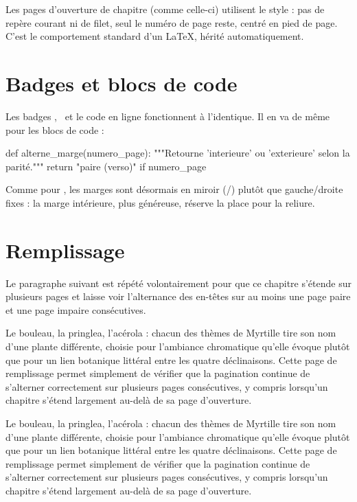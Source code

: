 \documentclass[theme=pringlea]{myrtillebook}
\begin{document}
\begin{infobox}
Les pages d'ouverture de chapitre (comme celle-ci) utilisent le style  : pas de repère courant ni de filet, seul le numéro de page reste, centré en pied de page. C'est le comportement standard d'un  LaTeX, hérité automatiquement.
\end{infobox}

\section{Badges et blocs de code}
Les badges \badgeReq, \badgeOpt\ et le code en ligne  fonctionnent à l'identique. Il en va de même pour les blocs de code :

\begin{pyblock}
def alterne_marge(numero_page):
    """Retourne 'interieure' ou 'exterieure' selon la parité."""
    return "paire (verso)" if numero_page %
\end{pyblock}

\begin{warnbox}
Comme pour , les marges sont désormais en miroir (/) plutôt que gauche/droite fixes : la marge intérieure, plus généreuse, réserve la place pour la reliure.
\end{warnbox}

\section{Remplissage}
Le paragraphe suivant est répété volontairement pour que ce chapitre s'étende sur plusieurs pages et laisse voir l'alternance des en-têtes sur au moins une page paire et une page impaire consécutives.


Le bouleau, la pringlea, l'acérola : chacun des thèmes de Myrtille tire son nom d'une plante différente, choisie pour l'ambiance chromatique qu'elle évoque plutôt que pour un lien botanique littéral entre les quatre déclinaisons. Cette page de remplissage permet simplement de vérifier que la pagination continue de s'alterner correctement sur plusieurs pages consécutives, y compris lorsqu'un chapitre s'étend largement au-delà de sa page d'ouverture.

Le bouleau, la pringlea, l'acérola : chacun des thèmes de Myrtille tire son nom d'une plante différente, choisie pour l'ambiance chromatique qu'elle évoque plutôt que pour un lien botanique littéral entre les quatre déclinaisons. Cette page de remplissage permet simplement de vérifier que la pagination continue de s'alterner correctement sur plusieurs pages consécutives, y compris lorsqu'un chapitre s'étend largement au-delà de sa page d'ouverture.
\end{document}
